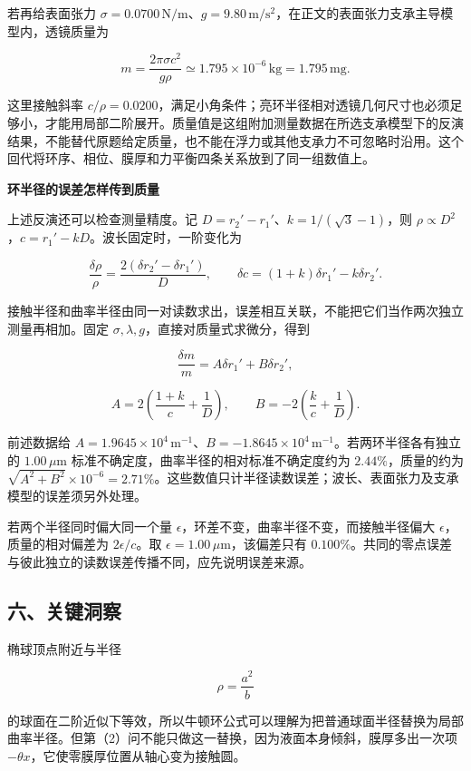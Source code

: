 \documentclass[12pt,a4paper,UTF8]{ctexart}
\begin{document}
若再给表面张力
\(\sigma=0.0700\,\mathrm{N/m}\)、\(g=9.80\,\mathrm{m/s^2}\)，在正文的表面张力支承主导模型内，透镜质量为

\[m=\frac{2\pi\sigma c^2}{g\rho}\simeq1.795\times10^{-6}\,\mathrm{kg}=1.795\,\mathrm{mg}.\]

这里接触斜率
\(c/\rho=0.0200\)，满足小角条件；亮环半径相对透镜几何尺寸也必须足够小，才能用局部二阶展开。质量值是这组附加测量数据在所选支承模型下的反演结果，不能替代原题给定质量，也不能在浮力或其他支承力不可忽略时沿用。这个回代将环序、相位、膜厚和力平衡四条关系放到了同一组数值上。

\textbf{环半径的误差怎样传到质量}

上述反演还可以检查测量精度。记 \(D=r_2'-r_1'\)、\(k=1/(\sqrt3-1)\)，则
\(\rho\propto D^2\)，\(c=r_1'-kD\)。波长固定时，一阶变化为

\[\frac{\delta\rho}{\rho}=\frac{2(\delta r_2'-\delta r_1')}{D},\qquad \delta c=(1+k)\delta r_1'-k\delta r_2'.\]

接触半径和曲率半径由同一对读数求出，误差相互关联，不能把它们当作两次独立测量再相加。固定
\(\sigma,\lambda,g\)，直接对质量式求微分，得到

\[\frac{\delta m}{m}=A\delta r_1'+B\delta r_2',\]

\[A=2\left(\frac{1+k}{c}+\frac1D\right),\qquad B=-2\left(\frac{k}{c}+\frac1D\right).\]

前述数据给
\(A=1.9645\times10^4\,\mathrm{m^{-1}}\)、\(B=-1.8645\times10^4\,\mathrm{m^{-1}}\)。若两环半径各有独立的
\(1.00\,\mu\mathrm m\) 标准不确定度，曲率半径的相对标准不确定度约为
\(2.44\%\)，质量的约为
\(\sqrt{A^2+B^2}\times10^{-6}=2.71\%\)。这些数值只计半径读数误差；波长、表面张力及支承模型的误差须另外处理。

若两个半径同时偏大同一个量
\(\epsilon\)，环差不变，曲率半径不变，而接触半径偏大
\(\epsilon\)，质量的相对偏差为 \(2\epsilon/c\)。取
\(\epsilon=1.00\,\mu\mathrm m\)，该偏差只有
\(0.100\%\)。共同的零点误差与彼此独立的读数误差传播不同，应先说明误差来源。

\subsection{六、关键洞察}\label{ux516dux5173ux952eux6d1eux5bdf-7}

椭球顶点附近与半径

\[
\rho=\frac{a^2}{b}
\]

的球面在二阶近似下等效，所以牛顿环公式可以理解为把普通球面半径替换为局部曲率半径。但第（2）问不能只做这一替换，因为液面本身倾斜，膜厚多出一次项
\(-\theta x\)，它使零膜厚位置从轴心变为接触圆。
\end{document}
